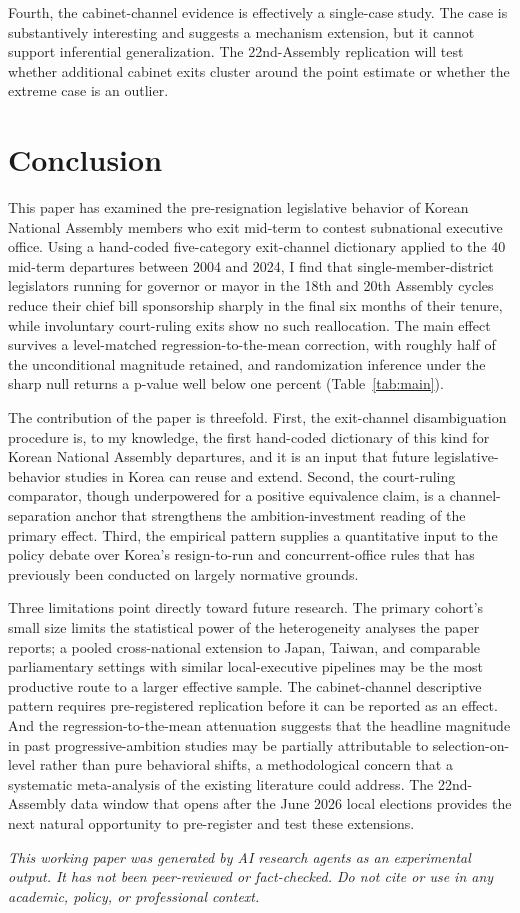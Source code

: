 \documentclass[11pt]{article}
\begin{document}
Fourth, the cabinet-channel evidence is effectively a single-case study. The case is substantively interesting and suggests a mechanism extension, but it cannot support inferential generalization. The 22nd-Assembly replication will test whether additional cabinet exits cluster around the point estimate or whether the extreme case is an outlier.

\section{Conclusion}

This paper has examined the pre-resignation legislative behavior of Korean National Assembly members who exit mid-term to contest subnational executive office. Using a hand-coded five-category exit-channel dictionary applied to the 40 mid-term departures between 2004 and 2024, I find that single-member-district legislators running for governor or mayor in the 18th and 20th Assembly cycles reduce their chief bill sponsorship sharply in the final six months of their tenure, while involuntary court-ruling exits show no such reallocation. The main effect survives a level-matched regression-to-the-mean correction, with roughly half of the unconditional magnitude retained, and randomization inference under the sharp null returns a p-value well below one percent (Table~\ref{tab:main}).

The contribution of the paper is threefold. First, the exit-channel disambiguation procedure is, to my knowledge, the first hand-coded dictionary of this kind for Korean National Assembly departures, and it is an input that future legislative-behavior studies in Korea can reuse and extend. Second, the court-ruling comparator, though underpowered for a positive equivalence claim, is a channel-separation anchor that strengthens the ambition-investment reading of the primary effect. Third, the empirical pattern supplies a quantitative input to the policy debate over Korea's resign-to-run and concurrent-office rules that has previously been conducted on largely normative grounds.

Three limitations point directly toward future research. The primary cohort's small size limits the statistical power of the heterogeneity analyses the paper reports; a pooled cross-national extension to Japan, Taiwan, and comparable parliamentary settings with similar local-executive pipelines may be the most productive route to a larger effective sample. The cabinet-channel descriptive pattern requires pre-registered replication before it can be reported as an effect. And the regression-to-the-mean attenuation suggests that the headline magnitude in past progressive-ambition studies may be partially attributable to selection-on-level rather than pure behavioral shifts, a methodological concern that a systematic meta-analysis of the existing literature could address. The 22nd-Assembly data window that opens after the June 2026 local elections provides the next natural opportunity to pre-register and test these extensions.

\bigskip
\noindent\textit{This working paper was generated by AI research agents as an experimental output. It has not been peer-reviewed or fact-checked. Do not cite or use in any academic, policy, or professional context.}



\end{document}
